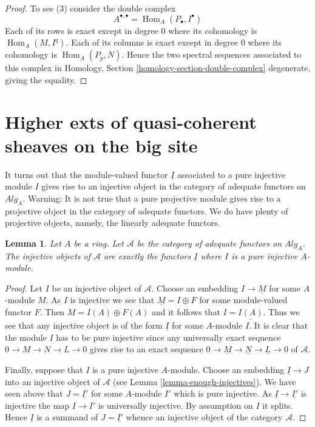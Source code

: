 \documentclass{stacks-project}
\theoremstyle{plain}
\newtheorem{lemma}[subsection]{Lemma}
\theoremstyle{definition}
\theoremstyle{remark}
\numberwithin{equation}{subsection}
\def\Hom{\mathop{\mathrm{Hom}}\nolimits}
\begin{document}
\begin{proof}
To see (3) consider the double complex
$$
A^{\bullet, \bullet} = \Hom_A(P_\bullet, I^\bullet)
$$
Each of its rows is exact except in degree $0$ where its cohomology
is $\Hom_A(M, I^q)$. Each of its columns is exact except in degree $0$
where its cohomology is $\Hom_A(P_p, N)$. Hence the two spectral
sequences associated to this complex in
Homology, Section \ref{homology-section-double-complex}
degenerate, giving the equality.
\end{proof}





\section{Higher exts of quasi-coherent sheaves on the big site}
\label{section-big}

\noindent
It turns out that the module-valued functor $\underline{I}$ associated to
a pure injective module $I$ gives rise to an injective object in the
category of adequate functors on $\textit{Alg}_A$.
Warning: It is not true that a pure projective module gives rise to
a projective object in the category of adequate functors. We do have
plenty of projective objects, namely, the linearly adequate functors.

\begin{lemma}
\label{lemma-pure-injective-injective-adequate}
Let $A$ be a ring.
Let $\mathcal{A}$ be the category of adequate functors on $\textit{Alg}_A$.
The injective objects of $\mathcal{A}$ are exactly the functors
$\underline{I}$ where $I$ is a pure injective $A$-module.
\end{lemma}

\begin{proof}
Let $I$ be an injective object of $\mathcal{A}$.
Choose an embedding $I \to \underline{M}$ for some $A$-module $M$.
As $I$ is injective we see that $\underline{M} = I \oplus F$ for some
module-valued functor $F$. Then $M = I(A) \oplus F(A)$ and it follows
that $I = \underline{I(A)}$. Thus we see that any injective object
is of the form $\underline{I}$ for some $A$-module $I$.
It is clear that the module $I$ has to be pure injective
since any universally exact sequence $0 \to M \to N \to L \to 0$
gives rise to an exact sequence
$0 \to \underline{M} \to \underline{N} \to \underline{L} \to 0$
of $\mathcal{A}$.

\medskip\noindent
Finally, suppose that $I$ is a pure injective
$A$-module. Choose an embedding $\underline{I} \to J$
into an injective object of $\mathcal{A}$ (see
Lemma \ref{lemma-enough-injectives}).
We have seen above that $J = \underline{I'}$
for some $A$-module $I'$ which is pure injective. As
$\underline{I} \to \underline{I'}$ is injective
the map $I \to I'$ is universally injective. By assumption on $I$
it splits. Hence $\underline{I}$ is a summand of $J = \underline{I'}$
whence an injective object of the category $\mathcal{A}$.
\end{proof}
\end{document}
